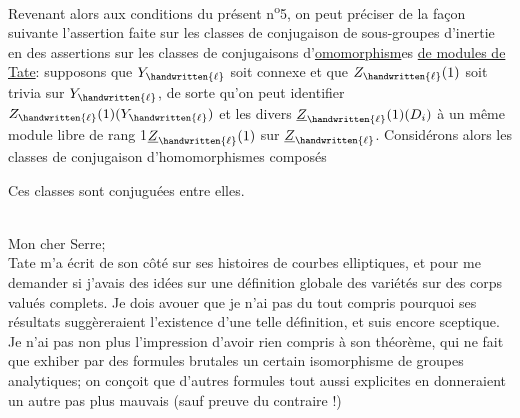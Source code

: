 Revenant alors aux conditions du présent n\textsuperscript{o}5, on peut préciser de la façon suivante l'assertion faite sur les  classes de conjugaison de sous-groupes d'inertie en des assertions sur les classes de conjugaisons d'\uline{omomorphism}es \uline{de modules de Tate}: supposons que $Y_{\handwritten{\ell}}$ soit connexe et que $Z_{\handwritten{\ell}}(1)$ soit trivia sur $Y_{\handwritten{\ell}}$,  de sorte qu'on peut identifier $Z_{\handwritten{\ell}}(1)(Y_{\handwritten{\ell}})$ et les divers $\underline{Z}_{\handwritten{\ell}}(1)(D_i)$ à un même module \handwritten{(}libre de rang 1\handwritten{)}$\underline{Z}_{\handwritten{\ell}}(1)$ sur $\underline{Z}_{\handwritten{\ell}}$. Considérons alors les classes de conjugaison d'homomorphismes composés

Ces classes sont conjuguées entre elles.


\\

Mon cher Serre;\\

Tate m'a écrit de son côté  sur ses histoires de courbes elliptiques, et pour me demander si j'avais des idées sur une définition globale des variétés  sur des corps valués complets. Je dois avouer que je n'ai pas du tout compris pourquoi ses résultats suggèreraient l'existence d'une telle définition, et suis encore sceptique. Je n'ai pas non plus l'impression d'avoir rien compris à son théorème, qui  ne fait que exhiber par des formules brutales un certain isomorphisme de groupes analytiques;  on conçoit que d'autres formules tout aussi explicites en donneraient un autre pas plus mauvais (sauf preuve du contraire !)

